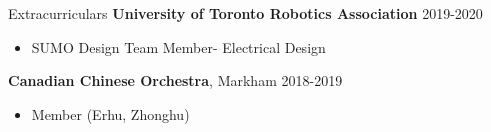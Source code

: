 \documentclass[hidelinks]{my_resume} %
\begin{document}
\begin{minipage}[t]{0.66\textwidth}
    \begin{rSection}{Extracurriculars}
        \textbf{University of Toronto Robotics Association} \hfill{2019-2020}   
        \begin{itemize}
            \item SUMO Design Team Member- Electrical Design
        \end{itemize}
        \textbf{Canadian Chinese Orchestra}, Markham        \hfill{2018-2019}
        \begin{itemize}
            \item Member (Erhu, Zhonghu)
        \end{itemize}
    \end{rSection}
\end{minipage}
\end{document}
